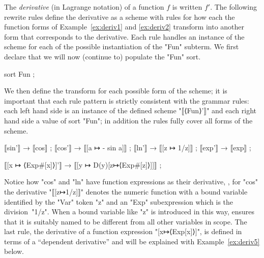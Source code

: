 \documentclass[11pt]{article} %
\begin{document}
\begin{example}\label{ex:deriv4}
  The \emph{derivative} (in Lagrange notation) of a function $f$ is written $f'$. The following
  rewrite rules define the derivative as a scheme with rules for how each the function forms of
  Example~\ref{ex:deriv1} and \ref{ex:deriv2} transform into another form that corresponds to the
  derivative. Each rule handles an instance of the scheme for each of the possible instantiation of
  the "Fun" subterm.
  We first declare that we will now (continue to) populate the "Fun" sort.
\begin{code}
sort Fun ;
\end{code}
  We then define the transform for each possible form of the scheme; it is important that each rule
  pattern is strictly consistent with the grammar rules: each left hand side is an instance of the
  defined scheme "⟦⟨Fun⟩'⟧" and each right hand side a value of sort "Fun"; in addition the rules
  fully cover all forms of the scheme.
\begin{code}  
⟦sin'⟧ → ⟦cos⟧ ;
⟦cos'⟧ → ⟦[a ↦ - sin a]⟧ ;
⟦ln'⟧  → ⟦[z ↦ 1/z]⟧ ;
⟦exp'⟧ → ⟦exp⟧ ;

⟦[x ↦ ⟨Exp#[x]⟩]'⟧ → ⟦[y ↦ D(y)[z↦⟨Exp#[z]⟩]]⟧ ;
\end{code}
  Notice how "cos" and "ln" have function expressions as their derivative, \eg, for "cos" the
  derivative "⟦[z↦1/z]⟧" denotes the numeric function with a bound variable identified by the "Var"
  token "z" and an "Exp" subexpression which is the division~"1/z".  When a bound variable like "z"
  is introduced in this way, \HAX ensures that it is suitably named to be different from all other
  variables in scope.  The last rule, the derivative of a function expression "[x↦⟨Exp[x]⟩]", is
  defined in terms of a ``dependent derivative'' and will be explained with Example~\ref{ex:deriv5}
  below.
\end{example}
\end{document}
